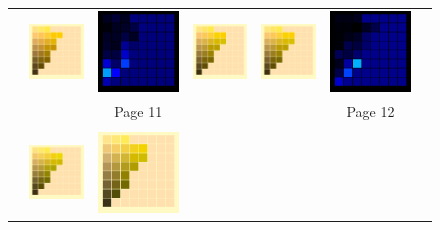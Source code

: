 \begin{figure}[t!]
{\begin{tabular}{ccccccc}
			&
			\includegraphics[width=.155\linewidth]{img/results_uplift_page11_ourFL11.png}
			& 
			\includegraphics[width=.155\linewidth]{img/results_uplift_page11_diff_ourFL11.png}
			&\quad
			\includegraphics[width=.155\linewidth]{img/results_uplift_page12_originalFL11.png}
			&
			\includegraphics[width=.155\linewidth]{img/results_uplift_page12_ourFL11.png}
			&
			\includegraphics[width=.155\linewidth]{img/results_uplift_page12_diff_ourFL11.png}\\
			& & Page 11 & & & Page 12 & \\
			\vspace{0.1em} \\ 
			\raisebox{0.4cm}[0pt][0pt]{\parbox[c][0pt][c]{0cm}{\hspace{-1.5em}\\[20pt]}\par}
			&\includegraphics[width=.155\linewidth]{img/results_uplift_page13_originalFL11.png}
			&
			\includegraphics[width=.155\linewidth]{img/results_uplift_page13_sigmoidFL11.png}

\end{tabular}}
\end{figure}
